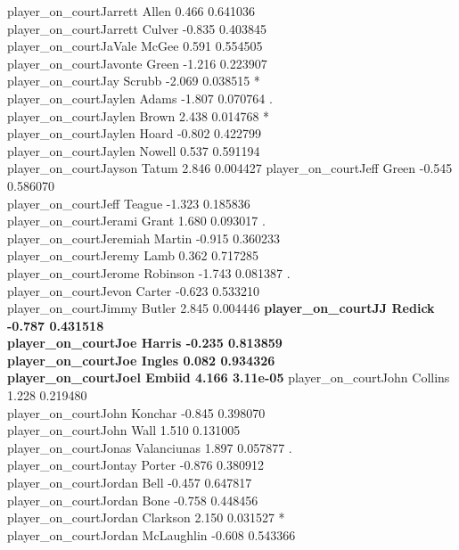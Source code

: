\documentclass[
  landscape]{article}
\begin{document}
{{player\_on\_courtJarrett Allen 0.466 0.641036\\
player\_on\_courtJarrett Culver -0.835 0.403845\\
player\_on\_courtJaVale McGee 0.591 0.554505\\
player\_on\_courtJavonte Green -1.216 0.223907\\
player\_on\_courtJay Scrubb -2.069 0.038515 *\\
player\_on\_courtJaylen Adams -1.807 0.070764 .\\
player\_on\_courtJaylen Brown 2.438 0.014768 *\\
player\_on\_courtJaylen Hoard -0.802 0.422799\\
player\_on\_courtJaylen Nowell 0.537 0.591194\\
player\_on\_courtJayson Tatum 2.846 0.004427 } player\_on\_courtJeff
Green -0.545 0.586070\\
player\_on\_courtJeff Teague -1.323 0.185836\\
player\_on\_courtJerami Grant 1.680 0.093017 .\\
player\_on\_courtJeremiah Martin -0.915 0.360233\\
player\_on\_courtJeremy Lamb 0.362 0.717285\\
player\_on\_courtJerome Robinson -1.743 0.081387 .\\
player\_on\_courtJevon Carter -0.623 0.533210\\
player\_on\_courtJimmy Butler 2.845 0.004446 \textbf{
player\_on\_courtJJ Redick -0.787 0.431518\\
player\_on\_courtJoe Harris -0.235 0.813859\\
player\_on\_courtJoe Ingles 0.082 0.934326\\
player\_on\_courtJoel Embiid 4.166 3.11e-05 }} player\_on\_courtJohn
Collins 1.228 0.219480\\
player\_on\_courtJohn Konchar -0.845 0.398070\\
player\_on\_courtJohn Wall 1.510 0.131005\\
player\_on\_courtJonas Valanciunas 1.897 0.057877 .\\
player\_on\_courtJontay Porter -0.876 0.380912\\
player\_on\_courtJordan Bell -0.457 0.647817\\
player\_on\_courtJordan Bone -0.758 0.448456\\
player\_on\_courtJordan Clarkson 2.150 0.031527 *\\
player\_on\_courtJordan McLaughlin -0.608 0.543366\\
\end{document}
